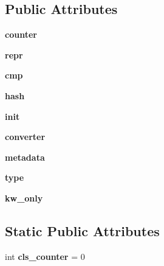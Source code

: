 \subsection*{Public Attributes}
\begin{DoxyCompactItemize}
\item 
\mbox{\label{classattr_1_1__make_1_1___counting_attr_ae3abec03d45c9691a5adc2bdb6c2dc4d}} 
{\bfseries counter}
\item 
\mbox{\label{classattr_1_1__make_1_1___counting_attr_afd9aa60aaadfebf5676b656a63b24643}} 
{\bfseries repr}
\item 
\mbox{\label{classattr_1_1__make_1_1___counting_attr_a88396847f1d748a9450eb1810a83183e}} 
{\bfseries cmp}
\item 
\mbox{\label{classattr_1_1__make_1_1___counting_attr_a496d196a2939b39af602ac98970ee165}} 
{\bfseries hash}
\item 
\mbox{\label{classattr_1_1__make_1_1___counting_attr_a00de037dfa750c6aa42198d2b82db8e7}} 
{\bfseries init}
\item 
\mbox{\label{classattr_1_1__make_1_1___counting_attr_adc82b2e856ba49cbbc0d697d7395a8d9}} 
{\bfseries converter}
\item 
\mbox{\label{classattr_1_1__make_1_1___counting_attr_ab7afd32162d3bf235fbe4fcf8a035c99}} 
{\bfseries metadata}
\item 
\mbox{\label{classattr_1_1__make_1_1___counting_attr_a434383d888c94a25b59704aac622618b}} 
{\bfseries type}
\item 
\mbox{\label{classattr_1_1__make_1_1___counting_attr_a553d8758a1b5e2175918c1f3e0944fd6}} 
{\bfseries kw\+\_\+only}
\end{DoxyCompactItemize}
\subsection*{Static Public Attributes}
\begin{DoxyCompactItemize}
\item 
\mbox{\label{classattr_1_1__make_1_1___counting_attr_a417ff2fabd1407f245358b1c7402f769}} 
int {\bfseries cls\+\_\+counter} = 0
\end{DoxyCompactItemize}


